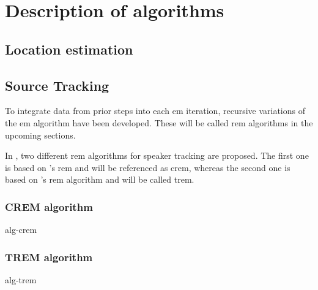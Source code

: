 \chapter{Description of algorithms}
\label{chap:algorithms}


\section{Location estimation}
\label{sec:algLocEst}

\section{Source Tracking}
\label{sec:algSrcTrack}


To integrate data from prior steps into each \gls{em} iteration, recursive variations of the \gls{em} algorithm have been developed. These will be called \gls{rem} algorithms in the upcoming sections.

In \cite{Schwartz2014}, two different \gls{rem} algorithms for speaker tracking are proposed. The first one is based on \citeauthor{Cappe2009}'s \gls{rem} and will be referenced as \acrshort{crem}, whereas the second one is based on \citeauthor{Titterington1984}'s \gls{rem} algorithm and will be called \acrshort{trem}.

\subsection{CREM algorithm}
\label{sec:crem}
{alg-crem}

\subsection{TREM algorithm}
\label{sec:trem}
{alg-trem}
